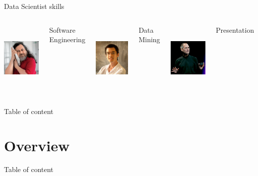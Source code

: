 \documentclass[unicode, notheorems]{beamer}
\begin{document}
\begin{frame}{Data Scientist skills}
\begin{columns}
\begin{center}
	\includegraphics[height=3.5cm]{images/software-developer}
\end{center}
\begin{center}
Software Engineering
\end{center}
\begin{center}
	\includegraphics[height=3.5cm]{images/scientist}
\end{center}
\begin{center}
Data Mining
\end{center}
\begin{center}
	\includegraphics[height=3.5cm]{images/presenter}
\end{center}
\begin{center}
Presentation
\end{center}
\end{columns}
\end{frame}


\begin{frame}{Table of content}
  \tableofcontents
\end{frame}


\section{Overview}
\begin{frame}{Table of content}
\tableofcontents[currentsection]
\end{frame}
\end{document}
